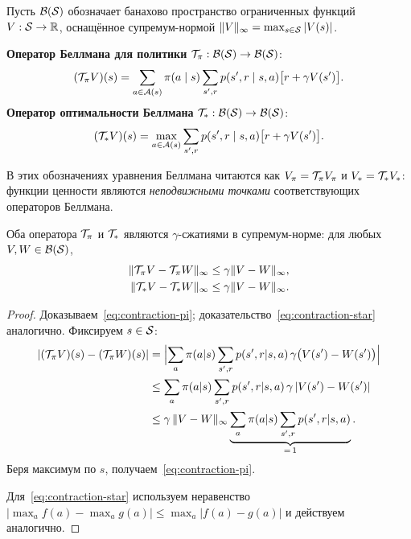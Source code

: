 \begin{definition}
\label{def:bellman-operators}
Пусть $\mathcal{B}(\mathcal{S})$ обозначает банахово пространство ограниченных функций $V : \mathcal{S} \to \mathbb{R}$, оснащённое супремум-нормой $\|V\|_\infty = \max_{s \in \mathcal{S}} |V(s)|$.

\textbf{Оператор Беллмана для политики} $\mathcal{T}_\pi : \mathcal{B}(\mathcal{S}) \to \mathcal{B}(\mathcal{S})$:
\begin{equation}
\label{eq:bellman-policy-op}
(\mathcal{T}_\pi V)(s)
= \sum_{a \in \mathcal{A}(s)} \pi(a \mid s)
  \sum_{s', r} p(s', r \mid s, a)\bigl[r + \gamma V(s')\bigr].
\end{equation}
\textbf{Оператор оптимальности Беллмана} $\mathcal{T}_* : \mathcal{B}(\mathcal{S}) \to \mathcal{B}(\mathcal{S})$:
\begin{equation}
\label{eq:bellman-opt-op}
(\mathcal{T}_* V)(s)
= \max_{a \in \mathcal{A}(s)}
  \sum_{s', r} p(s', r \mid s, a)\bigl[r + \gamma V(s')\bigr].
\end{equation}
\end{definition}

В этих обозначениях уравнения Беллмана читаются как $V_\pi = \mathcal{T}_\pi V_\pi$ и $V_* = \mathcal{T}_* V_*$: функции ценности являются \emph{неподвижными точками} соответствующих операторов Беллмана.

\begin{theorem}
\label{thm:contraction}
Оба оператора $\mathcal{T}_\pi$ и $\mathcal{T}_*$ являются $\gamma$-сжатиями в супремум-норме: для любых $V, W \in \mathcal{B}(\mathcal{S})$,
\begin{align}
\|\mathcal{T}_\pi V - \mathcal{T}_\pi W\|_\infty &\le \gamma \|V - W\|_\infty, \label{eq:contraction-pi} \\
\|\mathcal{T}_* V - \mathcal{T}_* W\|_\infty &\le \gamma \|V - W\|_\infty. \label{eq:contraction-star}
\end{align}
\end{theorem}

\begin{proof}
Доказываем~\eqref{eq:contraction-pi}; доказательство~\eqref{eq:contraction-star} аналогично. Фиксируем $s \in \mathcal{S}$:
\begin{align*}
|(\mathcal{T}_\pi V)(s) - (\mathcal{T}_\pi W)(s)|
&= \Bigl|\sum_a \pi(a|s) \sum_{s',r} p(s',r|s,a)\,\gamma\bigl(V(s') - W(s')\bigr)\Bigr| \\
&\le \sum_a \pi(a|s) \sum_{s',r} p(s',r|s,a)\,\gamma\, |V(s') - W(s')| \\
&\le \gamma\, \|V - W\|_\infty
     \underbrace{\sum_a \pi(a|s) \sum_{s',r} p(s',r|s,a)}_{=\,1}.
\end{align*}
Беря максимум по $s$, получаем~\eqref{eq:contraction-pi}.

Для~\eqref{eq:contraction-star} используем неравенство $|\max_a f(a) - \max_a g(a)| \le \max_a |f(a) - g(a)|$ и действуем аналогично.
\end{proof}

